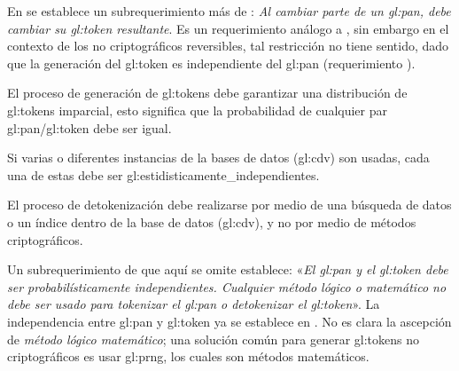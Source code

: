 En \cite{pci_tokens} se establece un subrequerimiento más de
: \textit{Al cambiar parte de un
\gls{gl:pan}, debe cambiar su \gls{gl:token} resultante}. Es un requerimiento
análogo a , sin embargo en el contexto
de los  no criptográficos reversibles, tal restricción no tiene sentido, dado
que  la generación del \gls{gl:token} es independiente del \gls{gl:pan}
(requerimiento ).

{
  El proceso de generación de \glspl{gl:token} debe garantizar una
  distribución de \glspl{gl:token} imparcial, esto significa que la
  probabilidad de cualquier par \gls{gl:pan}/\gls{gl:token} debe ser igual.
}

{
  Si varias o diferentes instancias de la bases de datos (\gls{gl:cdv}) son
  usadas, cada una de estas debe ser \glspl{gl:estidisticamente_independiente}.
}

{
  El proceso de detokenización debe realizarse por medio de una búsqueda de
  datos o un índice dentro de la base de datos (\gls{gl:cdv}), y no por medio
  de métodos criptográficos.
}


Un subrequerimiento de  que
aquí se omite establece: «\textit{El \gls{gl:pan} y el \gls{gl:token} debe ser
probabilísticamente independientes. Cualquier método lógico o matemático no
debe ser usado para \textit{tokenizar} el \gls{gl:pan} o \textit{detokenizar}
el \gls{gl:token}}». La independencia entre \gls{gl:pan} y \gls{gl:token} ya
se establece en . No es
clara la ascepción de \textit{método lógico matemático}; una solución
común para generar \glspl{gl:token} no criptográficos es usar \gls{gl:prng},
los cuales son métodos matemáticos.

